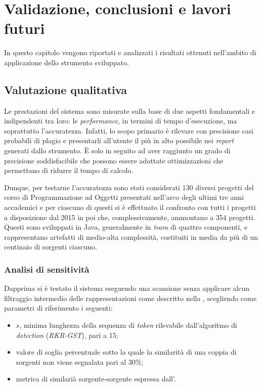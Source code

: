 \chapter{Validazione, conclusioni e lavori futuri}
\label{chapter:validation}
In questo capitolo vengono riportati e analizzati i risultati ottenuti nell'ambito di applicazione dello strumento sviluppato.

\section{Valutazione qualitativa}
Le prestazioni del sistema sono misurate sulla base di due aspetti fondamentali e indipendenti tra loro: le \textit{performance}, in termini di tempo d'esecuzione, ma soprattutto l'accuratezza.
%
Infatti, lo scopo primario è rilevare con precisione casi probabili di plagio e presentarli all'utente il più in alto possibile nei \textit{report} generati dallo strumento.
%
\`E solo in seguito ad aver raggiunto un grado di precisione soddisfacibile che possono essere adottate ottimizzazioni che permettano di ridurre il tempo di calcolo.

Dunque, per testarne l'accuratezza sono stati considerati 130 diversi progetti del corso di Programmazione ad Oggetti presentati nell'arco degli ultimi tre anni accademici e per ciascuno di questi si è effettuato il confronto con tutti i progetti a disposizione dal 2015 in poi che, complessivamente, ammontano a 354 progetti.
%
Questi sono sviluppati in Java, generalmente in \textit{team} di quattro componenti, e rappresentano artefatti di medio-alta complessità, costituiti in media da più di un centinaio di sorgenti ciascuno.

\subsection{Analisi di sensitività}
Dapprima si è testato il sistema eseguendo una scansione senza applicare alcun filtraggio intermedio delle rappresentazioni come descritto nella , scegliendo come parametri di riferimento i seguenti:
\begin{itemize}
    \item $s$, minima lunghezza della sequenza di \textit{token} rilevabile dall'algoritmo di \textit{detection} (\textit{RKR-GST}), pari a 15;
    \item valore di soglia percentuale sotto la quale la similarità di una coppia di sorgenti non viene segnalata pari al 30\%;
    \item metrica di similarià sorgente-sorgente espressa dall'.
\end{itemize}

